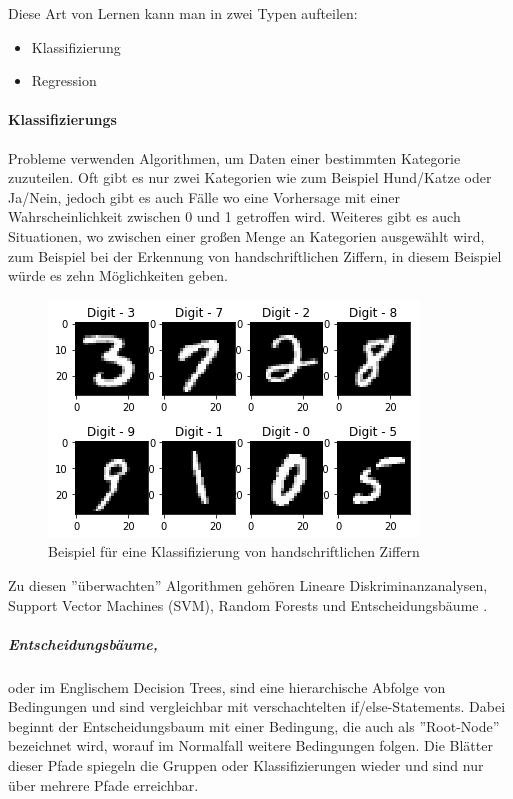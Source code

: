 Diese Art von Lernen kann man in zwei Typen aufteilen:

\begin{itemize}
    \item Klassifizierung
    \item Regression
\end{itemize}

\paragraph{Klassifizierungs} Probleme verwenden Algorithmen, um Daten einer bestimmten Kategorie zuzuteilen. Oft gibt es nur zwei Kategorien wie zum Beispiel Hund/Katze oder Ja/Nein, jedoch gibt es auch Fälle wo eine Vorhersage mit einer Wahrscheinlichkeit zwischen 0 und 1 getroffen wird. Weiteres gibt es auch Situationen, wo zwischen einer großen Menge an Kategorien ausgewählt wird, zum Beispiel bei der Erkennung von handschriftlichen Ziffern, in diesem Beispiel würde es zehn Möglichkeiten geben.

\begin{figure}[h]
    \centering
    \includegraphics{sections/machine-learning/images/0_8-vKSQnZvKbtKXKy.png}
    \caption{Beispiel für eine Klassifizierung von handschriftlichen Ziffern}
    \label{ziffern}
\end{figure}

Zu diesen ''überwachten'' Algorithmen gehören Lineare Diskriminanzanalysen, Support Vector Machines (SVM), Random Forests und Entscheidungsbäume \cite{SL:online}.

\subparagraph{Entscheidungsbäume,} oder im Englischem Decision Trees, sind eine hierarchische Abfolge von Bedingungen und sind vergleichbar mit verschachtelten if/else-Statements. Dabei beginnt der Entscheidungsbaum mit einer Bedingung, die auch als ''Root-Node'' bezeichnet wird, worauf im Normalfall weitere Bedingungen folgen. Die Blätter dieser Pfade spiegeln die Gruppen oder Klassifizierungen wieder und sind nur über mehrere Pfade erreichbar.

